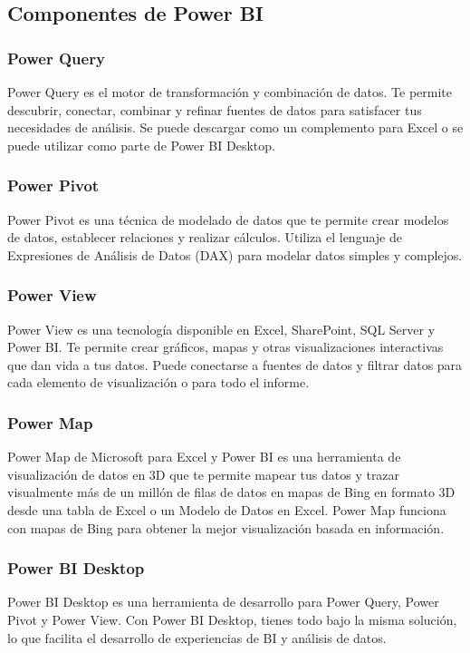 \subsection{Componentes de Power BI}

\subsubsection{Power Query}
Power Query es el motor de transformación y combinación de datos. Te permite descubrir, conectar, 
combinar y refinar fuentes de datos para satisfacer tus necesidades de análisis. Se puede descargar 
como un complemento para Excel o se puede utilizar como parte de Power BI Desktop.

\subsubsection{Power Pivot}
Power Pivot es una técnica de modelado de datos que te permite crear modelos de datos, establecer relaciones 
y realizar cálculos. Utiliza el lenguaje de Expresiones de Análisis de Datos (DAX) para modelar datos simples y complejos.

\subsubsection{Power View}
Power View es una tecnología disponible en Excel, SharePoint, SQL Server y Power BI. Te permite crear gráficos, 
mapas y otras visualizaciones interactivas que dan vida a tus datos. Puede conectarse a fuentes de datos y filtrar 
datos para cada elemento de visualización o para todo el informe.

\subsubsection{Power Map}
Power Map de Microsoft para Excel y Power BI es una herramienta de visualización de datos en 3D que te permite mapear 
tus datos y trazar visualmente más de un millón de filas de datos en mapas de Bing en formato 3D desde una tabla de Excel 
o un Modelo de Datos en Excel. Power Map funciona con mapas de Bing para obtener la mejor visualización basada en información.

\subsubsection{Power BI Desktop}
Power BI Desktop es una herramienta de desarrollo para Power Query, Power Pivot y Power View. Con Power BI Desktop, 
tienes todo bajo la misma solución, lo que facilita el desarrollo de experiencias de BI y análisis de datos.

